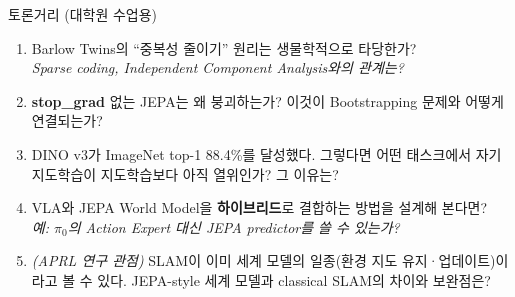 \documentclass[aspectratio=169,10pt]{beamer}
\begin{document}
\begin{frame}{토론거리 (대학원 수업용)}
\begin{enumerate}
  \item Barlow Twins의 ``중복성 줄이기'' 원리는 생물학적으로 타당한가?\\
        \footnotesize \textit{Sparse coding, Independent Component Analysis와의 관계는?}

  \vspace{0.3em}
  \normalsize
  \item \textbf{stop\_grad} 없는 JEPA는 왜 붕괴하는가? 이것이 Bootstrapping 문제와 어떻게 연결되는가?

  \vspace{0.3em}
  \item DINO v3가 ImageNet top-1 88.4\%를 달성했다. 그렇다면 어떤 태스크에서 자기지도학습이 지도학습보다 아직 열위인가? 그 이유는?

  \vspace{0.3em}
  \item VLA와 JEPA World Model을 \textbf{하이브리드}로 결합하는 방법을 설계해 본다면?\\
        \footnotesize \textit{예: $\pi_0$의 Action Expert 대신 JEPA predictor를 쓸 수 있는가?}

  \vspace{0.3em}
  \normalsize
  \item \textit{(APRL 연구 관점)} SLAM이 이미 세계 모델의 일종(환경 지도 유지·업데이트)이라고 볼 수 있다. JEPA-style 세계 모델과 classical SLAM의 차이와 보완점은?
\end{enumerate}
\end{frame}
\end{document}
